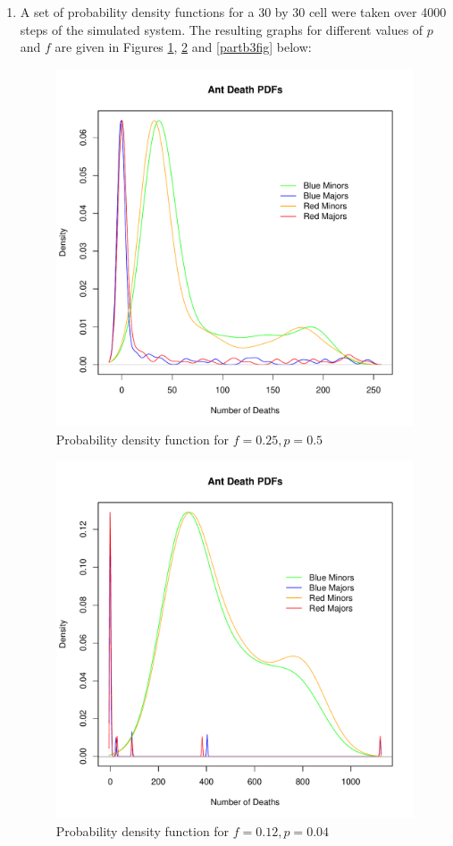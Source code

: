 \begin{enumerate}
\item A set of probability density functions for a 30 by 30 cell were taken 
over 4000 steps of the simulated system.  The resulting graphs for different
values of $p$ and $f$ are given in Figures \ref{partb1fig}, \ref{partb2fig} and 
\ref{partb3fig} below:

\begin{figure}[h!]
\centering
\includegraphics[scale=0.80]{partb1v1.pdf}
\caption{Probability density function for $f = 0.25, p = 0.5$}
\label{partb1fig}
\end{figure}

\begin{figure}[h!]
\centering
\includegraphics[scale=0.80]{partb2v1.pdf}
\caption{Probability density function for $f = 0.12, p = 0.04$}
\label{partb2fig}
\end{figure}


\end{enumerate}

